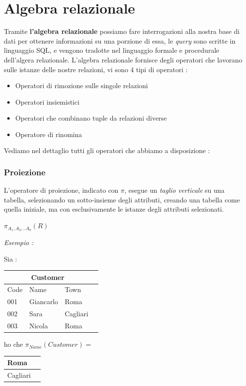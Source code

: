 \documentclass[12pt, letterpaper]{article}
\begin{document}
\newpage\section{Algebra relazionale}
Tramite \textbf{l'algebra relazionale} possiamo fare interrogazioni alla nostra base di dati per 
ottenere informazioni su una porzione di essa, le \textit{query} sono scritte in linguaggio SQL, e vengono
tradotte nel linguaggio formale e procedurale dell'algera relazionale. L'algebra relazionale fornisce 
degli operatori che lavorano sulle istanze delle nostre relazioni, vi sono 4 tipi di operatori :
\begin{itemize}
    \item Operatori di rimozione sulle singole relazioni
    \item Operatori insiemistici 
    \item Operatori che combinano tuple da relazioni diverse 
    \item Operatore di rinomina
\end{itemize}
Vediamo nel dettaglio tutti gli operatori che abbiamo a disposizione :
\subsubsection{Proiezione}\label{proiezione}
L'operatore di proiezione, indicato con \(\pi\), esegue un \textit{taglio verticale} su una 
tabella, selezionando un sotto-insieme degli attributi, creando una tabella come quella iniziale, 
ma con esclusivamente le istanze degli attributi selezionati.\begin{center}
    \( \pi_{A_1,A_2,..A_k}(R) \) 
\end{center}
\textit{Esempio :}\begin{center} Sia : 
    \begin{tabular}{|l|l|l|r|}
        \hline
    \multicolumn{3}{|c|}{\textbf{Customer}}\\
        \hline
        Code & Name & Town \\
        \hline
        001 & Giancarlo & Roma \\
        \hline
        002 & Sara & Cagliari \\
        \hline
        003 & Nicola & Roma \\
        \hline
        \end{tabular}
        ho che \(\pi_{Name}(Customer)=\)
        \begin{tabular}{ |l|r| } 
            
            \hline Roma \\ 
            \hline Cagliari  \\ 
            \hline
           \end{tabular}
\end{center}
\end{document}
